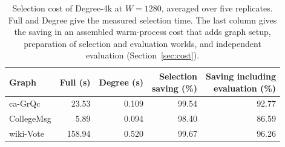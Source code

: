 \begin{table}[htbp]
\caption{Selection cost of Degree-4k at $W=1280$, averaged over five replicates. Full and Degree give the measured selection time. The last column gives the saving in an assembled warm-process cost that adds graph setup, preparation of selection and evaluation worlds, and independent evaluation (Section~\ref{sec:cost}).}\label{tab:cost}
\begin{tabular}{lrrrr}
\toprule
Graph & Full (s) & Degree (s) & \shortstack{Selection\\saving (\%)} & \shortstack{Saving including\\evaluation (\%)} \\
\midrule
ca-GrQc & 23.53 & 0.109 & 99.54 & 92.77 \\
CollegeMsg & 5.89 & 0.094 & 98.40 & 86.59 \\
wiki-Vote & 158.94 & 0.520 & 99.67 & 96.26 \\
\bottomrule
\end{tabular}
\end{table}
